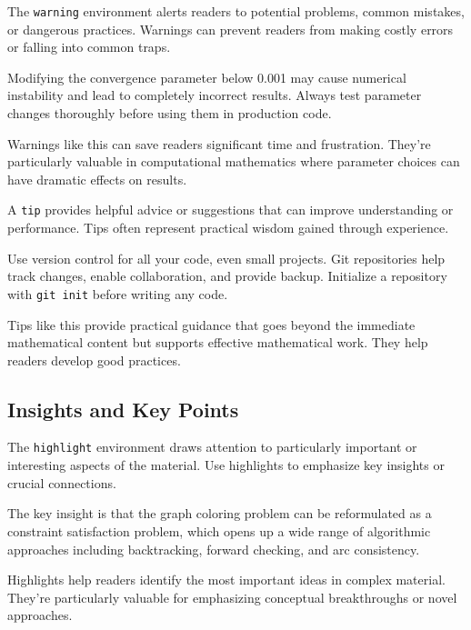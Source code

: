 \documentclass[9pt]{amsart}
\begin{document}
The \texttt{warning} environment alerts readers to potential problems, common
mistakes, or dangerous practices. Warnings can prevent readers from making
costly errors or falling into common traps.

\begin{warning}
    Modifying the convergence parameter below 0.001 may cause numerical instability and lead to completely incorrect results. Always test parameter changes thoroughly before using them in production code.
\end{warning}

Warnings like this can save readers significant time and frustration. They're
particularly valuable in computational mathematics where parameter choices can
have dramatic effects on results.

A \texttt{tip} provides helpful advice or suggestions that can improve
understanding or performance. Tips often represent practical wisdom gained
through experience.

\begin{tip}
    Use version control for all your code, even small projects. Git repositories help track changes, enable collaboration, and provide backup. Initialize a repository with \texttt{git init} before writing any code.
\end{tip}

Tips like this provide practical guidance that goes beyond the immediate
mathematical content but supports effective mathematical work. They help
readers develop good practices.

\subsection{Insights and Key Points}

The \texttt{highlight} environment draws attention to particularly important or
interesting aspects of the material. Use highlights to emphasize key insights
or crucial connections.

\begin{highlight}
    The key insight is that the graph coloring problem can be reformulated as a constraint satisfaction problem, which opens up a wide range of algorithmic approaches including backtracking, forward checking, and arc consistency.
\end{highlight}

Highlights help readers identify the most important ideas in complex material.
They're particularly valuable for emphasizing conceptual breakthroughs or novel
approaches.
\end{document}
